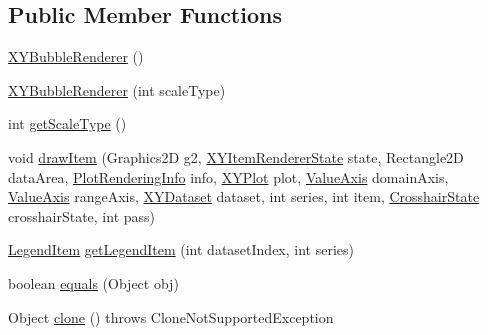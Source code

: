 \subsection*{Public Member Functions}
\begin{DoxyCompactItemize}
\item 
\mbox{\hyperlink{classorg_1_1jfree_1_1chart_1_1renderer_1_1xy_1_1_x_y_bubble_renderer_a7d3c319c53a14ac3f188e4969e6dbddc}{X\+Y\+Bubble\+Renderer}} ()
\item 
\mbox{\hyperlink{classorg_1_1jfree_1_1chart_1_1renderer_1_1xy_1_1_x_y_bubble_renderer_ac7a4c2b1d62ba09cd20fb7db9466316f}{X\+Y\+Bubble\+Renderer}} (int scale\+Type)
\item 
int \mbox{\hyperlink{classorg_1_1jfree_1_1chart_1_1renderer_1_1xy_1_1_x_y_bubble_renderer_ae17f0e3d44ccef802b3a43f370ddce7d}{get\+Scale\+Type}} ()
\item 
void \mbox{\hyperlink{classorg_1_1jfree_1_1chart_1_1renderer_1_1xy_1_1_x_y_bubble_renderer_a0f7b92a37e042c15ebc2ce4a073d5dae}{draw\+Item}} (Graphics2D g2, \mbox{\hyperlink{classorg_1_1jfree_1_1chart_1_1renderer_1_1xy_1_1_x_y_item_renderer_state}{X\+Y\+Item\+Renderer\+State}} state, Rectangle2D data\+Area, \mbox{\hyperlink{classorg_1_1jfree_1_1chart_1_1plot_1_1_plot_rendering_info}{Plot\+Rendering\+Info}} info, \mbox{\hyperlink{classorg_1_1jfree_1_1chart_1_1plot_1_1_x_y_plot}{X\+Y\+Plot}} plot, \mbox{\hyperlink{classorg_1_1jfree_1_1chart_1_1axis_1_1_value_axis}{Value\+Axis}} domain\+Axis, \mbox{\hyperlink{classorg_1_1jfree_1_1chart_1_1axis_1_1_value_axis}{Value\+Axis}} range\+Axis, \mbox{\hyperlink{interfaceorg_1_1jfree_1_1data_1_1xy_1_1_x_y_dataset}{X\+Y\+Dataset}} dataset, int series, int item, \mbox{\hyperlink{classorg_1_1jfree_1_1chart_1_1plot_1_1_crosshair_state}{Crosshair\+State}} crosshair\+State, int pass)
\item 
\mbox{\hyperlink{classorg_1_1jfree_1_1chart_1_1_legend_item}{Legend\+Item}} \mbox{\hyperlink{classorg_1_1jfree_1_1chart_1_1renderer_1_1xy_1_1_x_y_bubble_renderer_a11dba708aad07635e92cfaa179d259c2}{get\+Legend\+Item}} (int dataset\+Index, int series)
\item 
boolean \mbox{\hyperlink{classorg_1_1jfree_1_1chart_1_1renderer_1_1xy_1_1_x_y_bubble_renderer_a22a7429b60fcfa9b663aa5dc0793d4ce}{equals}} (Object obj)
\item 
Object \mbox{\hyperlink{classorg_1_1jfree_1_1chart_1_1renderer_1_1xy_1_1_x_y_bubble_renderer_a4d7fded623bea466292cc35dfba6a8f8}{clone}} ()  throws Clone\+Not\+Supported\+Exception 
\end{DoxyCompactItemize}
